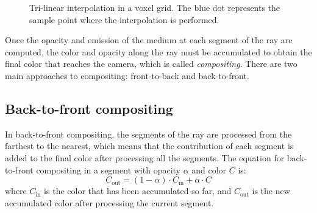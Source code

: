 \begin{figure}
    \caption{Tri-linear interpolation in a voxel grid. The blue dot represents the sample point where the interpolation is performed.}
    \label{fig:tri_linear_interpolation}
\end{figure}

Once the opacity and emission of the medium at each segment of the ray are computed, the color and opacity along the ray must be accumulated to obtain the final color that reaches the camera, which is called \emph{compositing}. There are two main approaches to compositing: front-to-back and back-to-front.

\subsection{Back-to-front compositing}

In back-to-front compositing, the segments of the ray are processed from the farthest to the nearest, which means that the contribution of each segment is added to the final color after processing all the segments. The equation for back-to-front compositing in a segment with opacity $\alpha$ and color $C$ is:
\begin{equation*}
C_{\text{out}} = (1 - \alpha) \cdot C_{\text{in}} + \alpha \cdot C
\end{equation*}
where $C_{\text{in}}$ is the color that has been accumulated so far, and $C_{\text{out}}$ is the new accumulated color after processing the current segment.

